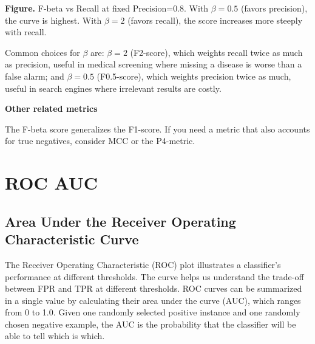 \textbf{Figure.} F-beta vs Recall at fixed Precision=0.8. With $\beta=0.5$ (favors precision), the curve is highest. With $\beta=2$ (favors recall), the score increases more steeply with recall.

{Common choices for $\beta$ are: $\beta = 2$ (F2-score), which weights recall twice as much as precision, useful in medical screening where missing a disease
is worse than a false alarm; and $\beta = 0.5$ (F0.5-score), which weights precision twice as much, useful in search engines where irrelevant results are costly.}

\textbf{Other related metrics}

The F-beta score generalizes the F1-score. If you need a metric that also accounts for true negatives, consider MCC or the P4-metric.

\clearpage
\thispagestyle{classificationstyle}
\section{ROC AUC}
\subsection{Area Under the Receiver Operating Characteristic Curve}

The Receiver Operating Characteristic (ROC) plot illustrates a classifier's performance at different thresholds. The curve helps us understand the trade-off between FPR
and TPR at different thresholds. ROC curves can be summarized in a single value by calculating their area under the curve (AUC), which ranges from 0 to 1.0.
Given one randomly selected positive instance and one randomly chosen negative example, the AUC is the probability that the classifier will be able to tell which is which.

\begin{center}
\end{center}

